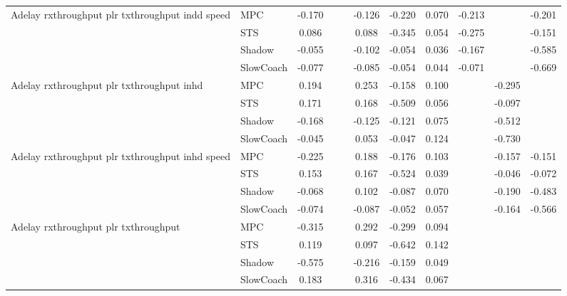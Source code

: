 \begin{tabular}{|l|l|*{9}{c|}}
\midrule
Adelay rxthroughput plr txthroughput indd speed    & MPC &   -0.170 &        &        & -0.126 & -0.220 &  0.070 &  -0.213 &      &   -0.201 \\
                              & STS &    0.086 &        &        &  0.088 & -0.345 &  0.054 &  -0.275 &      &   -0.151 \\
                              & Shadow &   -0.055 &        &        & -0.102 & -0.054 &  0.036 &  -0.167 &      &   -0.585 \\
                              & SlowCoach &   -0.077 &        &        & -0.085 & -0.054 &  0.044 &  -0.071 &      &   -0.669 \\
\midrule
Adelay rxthroughput plr txthroughput inhd    & MPC &    0.194 &        &        &  0.253 & -0.158 &  0.100 &      &  -0.295 &       \\
                              & STS &    0.171 &        &        &  0.168 & -0.509 &  0.056 &      &  -0.097 &       \\
                              & Shadow &   -0.168 &        &        & -0.125 & -0.121 &  0.075 &      &  -0.512 &       \\
                              & SlowCoach &   -0.045 &        &        &  0.053 & -0.047 &  0.124 &      &  -0.730 &       \\
\midrule
Adelay rxthroughput plr txthroughput inhd speed    & MPC &   -0.225 &        &        &  0.188 & -0.176 &  0.103 &      &  -0.157 &   -0.151 \\
                              & STS &    0.153 &        &        &  0.167 & -0.524 &  0.039 &      &  -0.046 &   -0.072 \\
                              & Shadow &   -0.068 &        &        &  0.102 & -0.087 &  0.070 &      &  -0.190 &   -0.483 \\
                              & SlowCoach &   -0.074 &        &        & -0.087 & -0.052 &  0.057 &      &  -0.164 &   -0.566 \\
\midrule
Adelay rxthroughput plr txthroughput    & MPC &   -0.315 &        &        &  0.292 & -0.299 &  0.094 &      &      &       \\
                              & STS &    0.119 &        &        &  0.097 & -0.642 &  0.142 &      &      &       \\
                              & Shadow &   -0.575 &        &        & -0.216 & -0.159 &  0.049 &      &      &       \\
                              & SlowCoach &    0.183 &        &        &  0.316 & -0.434 &  0.067 &      &      &       \\

\end{tabular}
